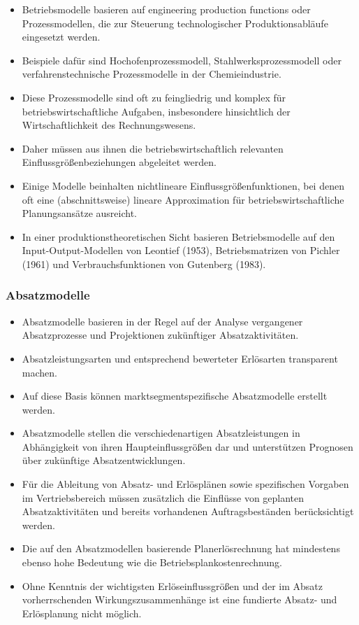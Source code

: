 \begin{itemize}
    \item Betriebsmodelle basieren auf engineering production functions oder Prozessmodellen, die zur Steuerung technologischer Produktionsabläufe eingesetzt werden.
    \item Beispiele dafür sind Hochofenprozessmodell, Stahlwerksprozessmodell oder verfahrenstechnische Prozessmodelle in der Chemieindustrie.
    \item Diese Prozessmodelle sind oft zu feingliedrig und komplex für betriebswirtschaftliche Aufgaben, insbesondere hinsichtlich der Wirtschaftlichkeit des Rechnungswesens.
    \item Daher müssen aus ihnen die betriebswirtschaftlich relevanten Einflussgrö{\ss}enbeziehungen abgeleitet werden.
    \item Einige Modelle beinhalten nichtlineare Einflussgrö{\ss}enfunktionen, bei denen oft eine (abschnittsweise) lineare Approximation für betriebswirtschaftliche Planungsansätze ausreicht.
    \item In einer produktionstheoretischen Sicht basieren Betriebsmodelle auf den Input-Output-Modellen von Leontief (1953), Betriebsmatrizen von Pichler (1961) und Verbrauchsfunktionen von Gutenberg (1983).
\end{itemize}

\subsubsection{Absatzmodelle}

\begin{itemize}
    \item Absatzmodelle basieren in der Regel auf der Analyse vergangener Absatzprozesse und Projektionen zukünftiger Absatzaktivitäten.
    \item Absatzleistungsarten und entsprechend bewerteter Erlösarten transparent machen.
    \item Auf diese Basis können marktsegmentspezifische Absatzmodelle erstellt werden.
    \item Absatzmodelle stellen die verschiedenartigen Absatzleistungen in Abhängigkeit von ihren Haupteinflussgrö{\ss}en dar und unterstützen Prognosen über zukünftige Absatzentwicklungen.
    \item Für die Ableitung von Absatz- und Erlösplänen sowie spezifischen Vorgaben im Vertriebsbereich müssen zusätzlich die Einflüsse von geplanten Absatzaktivitäten und bereits vorhandenen Auftragsbeständen berücksichtigt werden.
    \item Die auf den Absatzmodellen basierende Planerlösrechnung hat mindestens ebenso hohe Bedeutung wie die Betriebsplankostenrechnung.
    \item Ohne Kenntnis der wichtigsten Erlöseinflussgrö{\ss}en und der im Absatz vorherrschenden Wirkungszusammenhänge ist eine fundierte Absatz- und Erlösplanung nicht möglich.
\end{itemize}

